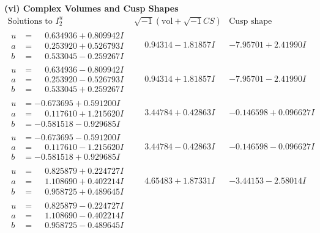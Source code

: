 \documentclass[1p]{elsarticle_modified}
\theoremstyle{definition}
\newcommand{\I}{\sqrt{-1}}
\begin{document}
\newpage\flushleft \textbf{(vi) Complex Volumes and Cusp Shapes}
$$\begin{array}{c|c|c}  
\text{Solutions to }I^u_{2}& \I (\text{vol} + \sqrt{-1}CS) & \text{Cusp shape}\\
 \hline 
\begin{aligned}
u &= \phantom{-}0.634936 + 0.809942 I \\
a &= \phantom{-}0.253920 + 0.526793 I \\
b &= \phantom{-}0.533045 - 0.259267 I\end{aligned}
 & \phantom{-}0.94314 - 1.81857 I & -7.95701 + 2.41990 I \\ \hline\begin{aligned}
u &= \phantom{-}0.634936 - 0.809942 I \\
a &= \phantom{-}0.253920 - 0.526793 I \\
b &= \phantom{-}0.533045 + 0.259267 I\end{aligned}
 & \phantom{-}0.94314 + 1.81857 I & -7.95701 - 2.41990 I \\ \hline\begin{aligned}
u &= -0.673695 + 0.591200 I \\
a &= \phantom{-}0.117610 + 1.215620 I \\
b &= -0.581518 - 0.929685 I\end{aligned}
 & \phantom{-}3.44784 + 0.42863 I & -0.146598 + 0.096627 I \\ \hline\begin{aligned}
u &= -0.673695 - 0.591200 I \\
a &= \phantom{-}0.117610 - 1.215620 I \\
b &= -0.581518 + 0.929685 I\end{aligned}
 & \phantom{-}3.44784 - 0.42863 I & -0.146598 - 0.096627 I \\ \hline\begin{aligned}
u &= \phantom{-}0.825879 + 0.224727 I \\
a &= \phantom{-}1.108690 + 0.402214 I \\
b &= \phantom{-}0.958725 + 0.489645 I\end{aligned}
 & \phantom{-}4.65483 + 1.87331 I & -3.44153 - 2.58014 I \\ \hline\begin{aligned}
u &= \phantom{-}0.825879 - 0.224727 I \\
a &= \phantom{-}1.108690 - 0.402214 I \\
b &= \phantom{-}0.958725 - 0.489645 I\end{aligned}

\end{array}$$
\end{document}
